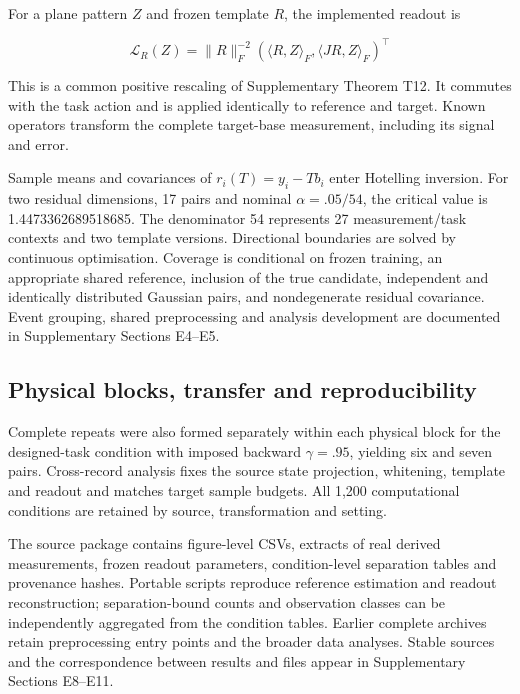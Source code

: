 \documentclass[11pt,a4paper]{article}
\begin{document}
\par
\noindent\begin{minipage}{\linewidth}

For a plane pattern \(Z\) and frozen template \(R\), the implemented
readout is

\[
\mathcal L_R(Z)=\|R\|_F^{-2}(\langle R,Z\rangle_F,\langle JR,Z\rangle_F)^\top
\]

\end{minipage}\par

This is a common positive rescaling of Supplementary Theorem T12. It
commutes with the task action and is applied identically to reference
and target. Known operators transform the complete target-base
measurement, including its signal and error.

Sample means and covariances of \(r_i(T)=y_i-Tb_i\) enter Hotelling
inversion. For two residual dimensions, 17 pairs and nominal
\(\alpha=.05/54\), the critical value is 1.4473362689518685. The
denominator 54 represents 27 measurement/task contexts and two template
versions. Directional boundaries are solved by continuous optimisation.
Coverage is conditional on frozen training, an appropriate shared
reference, inclusion of the true candidate, independent and identically
distributed Gaussian pairs, and nondegenerate residual covariance. Event
grouping, shared preprocessing and analysis development are documented
in Supplementary Sections E4–E5.

\subsection{Physical blocks, transfer and
reproducibility}\label{physical-blocks-transfer-and-reproducibility}

Complete repeats were also formed separately within each physical block
for the designed-task condition with imposed backward \(\gamma=.95\),
yielding six and seven pairs. Cross-record analysis fixes the source
state projection, whitening, template and readout and matches target
sample budgets. All 1,200 computational conditions are retained by
source, transformation and setting.

The source package contains figure-level CSVs, extracts of real derived
measurements, frozen readout parameters, condition-level separation
tables and provenance hashes. Portable scripts reproduce reference
estimation and readout reconstruction; separation-bound counts and
observation classes can be independently aggregated from the condition
tables. Earlier complete archives retain preprocessing entry points and
the broader data analyses. Stable sources and the correspondence between
results and files appear in Supplementary Sections E8–E11.
\end{document}
